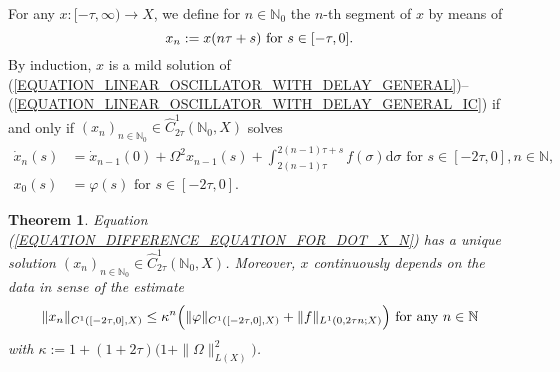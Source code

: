 \documentclass[12pt]{article}
\newtheorem{theorem}{Theorem}[section]
\numberwithin{equation}{section}
\numberwithin{equation}{section}
\begin{document}
	For any $x \colon [-\tau, \infty) \to X$,
	we define for $n \in \mathbb{N}_{0}$ the $n$-th segment of $x$ by means of
	\begin{equation}
		x_{n} := x(n\tau + s) \text{ for } s \in [-\tau, 0]. \notag
	\end{equation}
	By induction, $x$ is a mild solution of (\ref{EQUATION_LINEAR_OSCILLATOR_WITH_DELAY_GENERAL})--(\ref{EQUATION_LINEAR_OSCILLATOR_WITH_DELAY_GENERAL_IC})
	if and only if $(x_{n})_{n \in \mathbb{N}_{0}} \in \hat{C}^{1}_{2\tau}(\mathbb{N}_{0}, X)$ solves
	\begin{equation}
		\begin{split}
			\dot{x}_{n}(s) &= \dot{x}_{n-1}(0) + \Omega^{2} x_{n-1}(s) + \int_{2(n-1)\tau}^{2(n-1)\tau + s} f(\sigma) \mathrm{d}\sigma \text{ for } s \in [-2\tau, 0], n \in \mathbb{N}, \\
			x_{0}(s) &= \varphi(s) \text{ for } s \in [-2\tau, 0].
		\end{split}
		\label{EQUATION_DIFFERENCE_EQUATION_FOR_DOT_X_N}
	\end{equation}

	\begin{theorem}
		\label{THEOREM_MILD_SOLUTION_DISCRETE}
		Equation (\ref{EQUATION_DIFFERENCE_EQUATION_FOR_DOT_X_N}) has a unique solution $(x_{n})_{n \in \mathbb{N}_{0}} \in \hat{C}^{1}_{2\tau}(\mathbb{N}_{0}, X)$.
		Moreover, $x$ continuously depends on the data in sense of the estimate
		\begin{equation}
			\|x_{n}\|_{C^{1}([-2\tau, 0], X)} \leq
			\kappa^{n} \Big(\|\varphi\|_{C^{1}([-2\tau, 0], X)} + \|f\|_{L^{1}(0, 2\tau n;  X)}\Big)
			\text{ for any } n \in \mathbb{N} \notag
		\end{equation}
		with $\kappa := 1 + (1 + 2\tau) \big(1 + \|\Omega\|_{L(X)}^{2}\big)$.
	\end{theorem}
\end{document}
